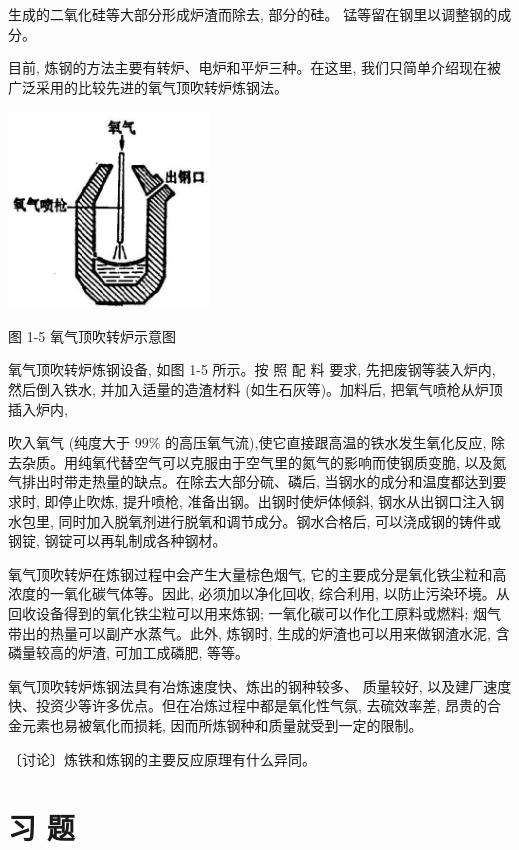 \documentclass[10pt]{article}
\begin{document}
生成的二氧化硅等大部分形成炉渣而除去, 部分的硅。 锰等留在钢里以调整钢的成分。

目前, 炼钢的方法主要有转炉、电炉和平炉三种。在这里, 我们只简单介绍现在被广泛采用的比较先进的氧气顶吹转炉炼钢法。

\begin{center}
\includegraphics[max width=0.4\textwidth]{images/01912d16-be99-77bb-9535-4f3ed8d9946f_32_416052.jpg}
\end{center}

图 1-5 氧气顶吹转炉示意图

氧气顶吹转炉炼钢设备, 如图 1-5 所示。按 照 配 料 要求, 先把废钢等装入炉内, 然后倒入铁水, 并加入适量的造渣材料 (如生石灰等)。加料后, 把氧气喷枪从炉顶插入炉内,

吹入氧气 (纯度大于 \({99}\%\) 的高压氧气流),使它直接跟高温的铁水发生氧化反应, 除去杂质。用纯氧代替空气可以克服由于空气里的氮气的影响而使钢质变脆, 以及氮气排出时带走热量的缺点。在除去大部分硫、磷后, 当钢水的成分和温度都达到要求时, 即停止吹炼, 提升喷枪, 准备出钢。出钢时使炉体倾斜, 钢水从出钢口注入钢水包里, 同时加入脱氧剂进行脱氧和调节成分。钢水合格后, 可以浇成钢的铸件或钢锭, 钢锭可以再轧制成各种钢材。

氧气顶吹转炉在炼钢过程中会产生大量棕色烟气, 它的主要成分是氧化铁尘粒和高浓度的一氧化碳气体等。因此, 必须加以净化回收, 综合利用, 以防止污染环境。从回收设备得到的氧化铁尘粒可以用来炼钢; 一氧化碳可以作化工原料或燃料; 烟气带出的热量可以副产水蒸气。此外, 炼钢时, 生成的炉渣也可以用来做钢渣水泥, 含磷量较高的炉渣, 可加工成磷肥, 等等。

氧气顶吹转炉炼钢法具有冶炼速度快、炼出的钢种较多、 质量较好, 以及建厂速度快、投资少等许多优点。但在冶炼过程中都是氧化性气氛, 去硫效率差, 昂贵的合金元素也易被氧化而损耗, 因而所炼钢种和质量就受到一定的限制。

〔讨论〕炼铁和炼钢的主要反应原理有什么异同。

\section*{习 题}
\end{document}
